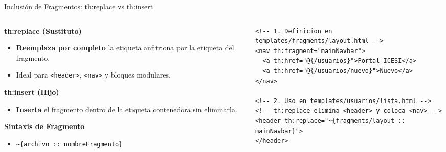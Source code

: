 \documentclass[aspectratio=169]{beamer}
\begin{document}
\begin{frame}[fragile]{Inclusi\'on de Fragmentos: th:replace vs th:insert}
\begin{columns}[T]
\begin{column}{0.48\textwidth}
  \textbf{th:replace (Sustituto)}
  \begin{itemize}
    \item \textbf{Reemplaza por completo} la etiqueta anfitriona por la etiqueta del fragmento.
    \item Ideal para \texttt{<header>}, \texttt{<nav>} y bloques modulares.
  \end{itemize}
  \vspace{4pt}
  \textbf{th:insert (Hijo)}
  \begin{itemize}
    \item \textbf{Inserta} el fragmento dentro de la etiqueta contenedora sin eliminarla.
  \end{itemize}
  \vspace{4pt}
  \textbf{Sintaxis de Fragmento}
  \begin{itemize}
    \item \texttt{\textasciitilde\{archivo :: nombreFragmento\}}
  \end{itemize}
\end{column}
\begin{column}{0.50\textwidth}
\begin{lstlisting}[style=ThymeleafStyle]
<!-- 1. Definicion en templates/fragments/layout.html -->
<nav th:fragment="mainNavbar">
  <a th:href="@{/usuarios}">Portal ICESI</a>
  <a th:href="@{/usuarios/nuevo}">Nuevo</a>
</nav>

<!-- 2. Uso en templates/usuarios/lista.html -->
<!-- th:replace elimina <header> y coloca <nav> -->
<header th:replace="~{fragments/layout :: mainNavbar}">
</header>
\end{lstlisting}
\end{column}
\end{columns}
\end{frame}


\end{document}

